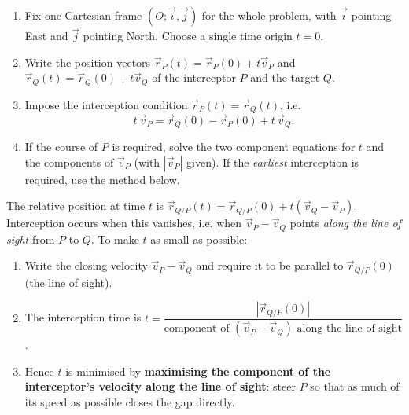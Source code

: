 \documentclass[11pt]{article}
\begin{document}
\begin{methode}
\begin{enumerate}
\item Fix one Cartesian frame $(O;\vec{i},\vec{j})$ for the whole problem, with $\vec{i}$ pointing East and $\vec{j}$ pointing North. Choose a single time origin $t=0$.
\item Write the position vectors $\vec{r}_P(t)=\vec{r}_P(0)+t\vec{v}_P$ and $\vec{r}_Q(t)=\vec{r}_Q(0)+t\vec{v}_Q$ of the interceptor $P$ and the target $Q$.
\item Impose the interception condition $\vec{r}_P(t)=\vec{r}_Q(t)$, i.e.
\[ t\,\vec{v}_P = \vec{r}_Q(0)-\vec{r}_P(0)+t\,\vec{v}_Q . \]
\item If the course of $P$ is required, solve the two component equations for $t$ and the components of $\vec{v}_P$ (with $|\vec{v}_P|$ given). If the \emph{earliest} interception is required, use the method below.
\end{enumerate}
\end{methode}

\begin{methode}
The relative position at time $t$ is $\vec{r}_{Q/P}(t)=\vec{r}_{Q/P}(0)+t(\vec{v}_Q-\vec{v}_P)$. Interception occurs when this vanishes, i.e. when $\vec{v}_P-\vec{v}_Q$ points \emph{along the line of sight} from $P$ to $Q$. To make $t$ as small as possible:
\begin{enumerate}
\item Write the closing velocity $\vec{v}_P-\vec{v}_Q$ and require it to be parallel to $\vec{r}_{Q/P}(0)$ (the line of sight).
\item The interception time is $t=\dfrac{|\vec{r}_{Q/P}(0)|}{\text{component of }(\vec{v}_P-\vec{v}_Q)\text{ along the line of sight}}$.
\item Hence $t$ is minimised by \textbf{maximising the component of the interceptor's velocity along the line of sight}: steer $P$ so that as much of its speed as possible closes the gap directly.
\end{enumerate}
\end{methode}
\end{document}
